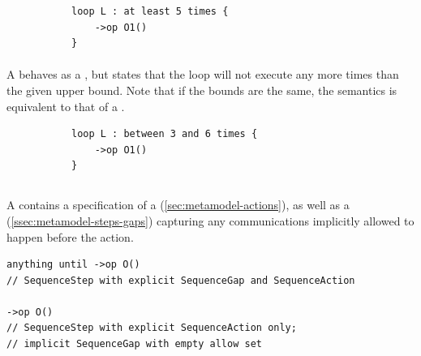 \begin{figure}[h!]
\begin{subfigure}[t]{\egtextwidth}
\begin{lstlisting}[style=Example]
loop L : at least 5 times {
    ->op O1()
}
\end{lstlisting}
\end{subfigure}
\hfill
\begin{subfigure}[t]{\eggraphicalwidth}
  \gsecaption
  \centering
\end{subfigure}
\end{figure}

\paragraph{\mrangeloopbound}
A \mrangeloopbound{} behaves as a \mlowerloopbound, but states that
the loop will not execute any more times than the given upper bound.
Note that if the bounds are the same, the semantics is equivalent
to that of a \mdefiniteloopbound{}.

\begin{figure}[H]
\begin{subfigure}[t]{\egtextwidth}
\begin{lstlisting}[style=Example]
loop L : between 3 and 6 times {
    ->op O1()
}
\end{lstlisting}
\end{subfigure}
\hfill
\begin{subfigure}[t]{\eggraphicalwidth}
  \gsecaption
  \centering
\end{subfigure}
\end{figure}

\subsection{\mactionstep}\label{ssec:metamodel-steps-action}

A \mactionstep{} contains a specification of a
\msequenceaction{} (\cref{sec:metamodel-actions}), as well as
a \msequencegap{} (\cref{ssec:metamodel-steps-gaps})
capturing any communications implicitly allowed to happen
before the action.

\begin{lstlisting}[style=Example]
anything until ->op O()
// SequenceStep with explicit SequenceGap and SequenceAction

->op O()
// SequenceStep with explicit SequenceAction only;
// implicit SequenceGap with empty allow set
\end{lstlisting}


